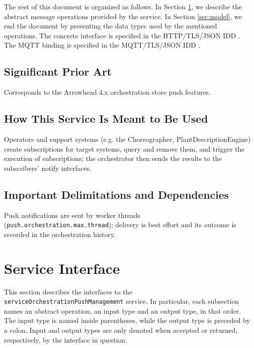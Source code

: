 \documentclass[a4paper]{arrowhead}
\begin{document}
The rest of this document is organized as follows.
In Section \ref{sec:operations}, we describe the abstract message operations provided by the service.
In Section \ref{sec:model}, we end the document by presenting the data types used by the mentioned operations.
The concrete interface is specified in the HTTP/TLS/JSON IDD \cite{ssso-serviceOrchestrationPushManagement-http-idd}. The MQTT binding is specified in the MQTT/TLS/JSON IDD \cite{ssso-serviceOrchestrationPushManagement-mqtt-idd}.

\subsection{Significant Prior Art}

Corresponds to the Arrowhead 4.x orchestration store push features.

\subsection{How This Service Is Meant to Be Used}

Operators and support systems (e.g. the Choreographer, Plant\allowbreak{}Description\allowbreak{}Engine) create subscriptions for target systems, query and remove them, and trigger the execution of subscriptions; the orchestrator then sends the results to the subscribers' notify interfaces.

\subsection{Important Delimitations and Dependencies}
\label{sec:delimitations}

Push notifications are sent by worker threads (\texttt{push.\allowbreak{}orchestration.\allowbreak{}max.\allowbreak{}thread}); delivery is best effort and its outcome is recorded in the orchestration history.

\newpage

\section{Service Interface}
\label{sec:operations}

This section describes the interfaces to the \texttt{service\allowbreak{}Orchestration\allowbreak{}Push\allowbreak{}Management} service.
In particular, each subsection names an abstract operation, an input type and an output type, in that order.
The input type is named inside parentheses, while the output type is preceded by a colon.
Input and output types are only denoted when accepted or returned, respectively, by the interface in question.
\end{document}
